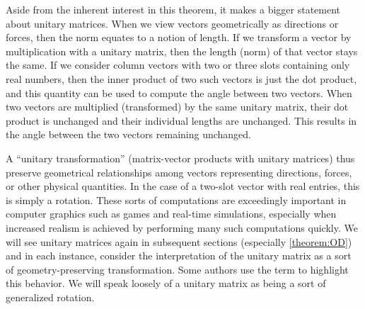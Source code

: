 \documentclass{ximera}
\begin{document}
Aside from the inherent interest in this theorem, it makes a bigger
statement about unitary matrices.  When we view vectors geometrically
as directions or forces, then the norm equates to a notion of length.
If we transform a vector by multiplication with a unitary matrix, then
the length (norm) of that vector stays the same.  If we consider
column vectors with two or three slots containing only real numbers,
then the inner product of two such vectors is just the dot product,
and this quantity can be used to compute the angle between two
vectors.  When two vectors are multiplied (transformed) by the same
unitary matrix, their dot product is unchanged and their individual
lengths are unchanged.  This results in the angle between the two
vectors remaining unchanged.


A ``unitary transformation'' (matrix-vector products with unitary
matrices) thus preserve geometrical relationships among vectors
representing directions, forces, or other physical quantities.  In the
case of a two-slot vector with real entries, this is simply a
rotation.  These sorts of computations are exceedingly important in
computer graphics such as games and real-time simulations, especially
when increased realism is achieved by performing many such
computations quickly.  We will see unitary matrices again in
subsequent sections (especially \ref{theorem:OD}) and in each
instance, consider the interpretation of the unitary matrix as a sort
of geometry-preserving transformation.  Some authors use the term
 to highlight this behavior.  We will speak loosely of a
unitary matrix as being a sort of generalized rotation.
\end{document}
